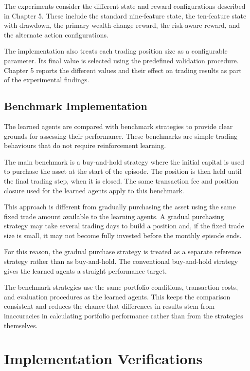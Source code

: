 The experiments consider the different state and reward configurations
described in Chapter 5. These include the standard nine-feature state,
the ten-feature state with drawdown, the primary wealth-change reward,
the risk-aware reward, and the alternate action configurations.

The implementation also treats each trading position size as a
configurable parameter. Its final value is selected using the predefined
validation procedure. Chapter 5 reports the different values and their
effect on trading results as part of the experimental findings.

\subsection{Benchmark Implementation}

The learned agents are compared with benchmark strategies to provide
clear grounds for assessing their performance. These benchmarks are
simple trading behaviours that do not require reinforcement learning.

The main benchmark is a buy-and-hold strategy where the initial capital
is used to purchase the asset at the start of the episode. The position
is then held until the final trading step, when it is closed. The same
transaction fee and position closure used for the learned agents apply
to this benchmark.

This approach is different from gradually purchasing the asset using the
same fixed trade amount available to the learning agents. A gradual
purchasing strategy may take several trading days to build a position
and, if the fixed trade size is small, it may not become fully invested
before the monthly episode ends.

For this reason, the gradual purchase strategy is treated as a separate
reference strategy rather than as buy-and-hold. The conventional
buy-and-hold strategy gives the learned agents a straight performance
target.

The benchmark strategies use the same portfolio conditions, transaction
costs, and evaluation procedures as the learned agents. This keeps the
comparison consistent and reduces the chance that differences in results
stem from inaccuracies in calculating portfolio performance rather than
from the strategies themselves.

\section{Implementation Verifications}

